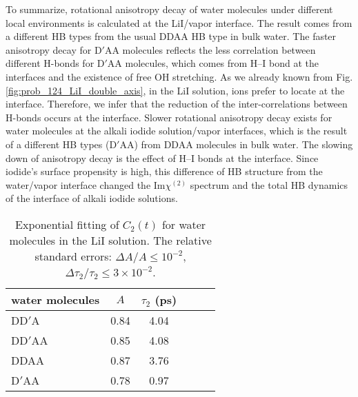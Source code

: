 To summarize, rotational anisotropy decay of water molecules under different local environments is calculated at the LiI/vapor interface. 
The result comes from a different HB types from the usual DDAA HB type in bulk water.
The faster anisotropy decay for D$'$AA molecules reflects the less correlation between different H-bonds for D$'$AA molecules, 
which comes from H--I bond at the interfaces and the existence of free OH stretching.
As we already known from Fig.\thinspace\ref{fig:prob_124_LiI_double_axis}, in the LiI solution, 
\I ions prefer to locate at the interface.  
Therefore, we infer that the reduction of the inter-correlations between H-bonds occurs at the interface. 
Slower rotational anisotropy decay exists for water molecules  at the alkali iodide solution/vapor interfaces, 
which is the result of a different HB types (D$'$AA) from DDAA molecules in bulk water. 
The slowing down of anisotropy decay is the effect of H--I bonds at the interface. 
Since iodide's surface propensity is high, this difference of HB structure from the water/vapor interface changed 
the Im$\chi^{(2)}$ spectrum and the total HB dynamics of the interface of alkali iodide solutions.  
%
\begin{table}[H]
\centering
\caption{\label{tab:fitting_c2_for_each_type_of_water}%
	Exponential fitting of $C_2(t)$ for water molecules in the LiI solution. 
        The relative standard errors: $\Delta A/A \le 10^{-2}$, $\Delta \tau_{2}/\tau_{2} \le 3\times 10^{-2}$.}
\begin{tabular}{lccccc}
water molecules & $A$  & $\tau_{2}$ (ps) \\
\hline
DD$'$A & 0.84 & 4.04  \\
DD$'$AA & 0.85 & 4.08  \\
DDAA & 0.87 & 3.76 \\
D$'$AA & 0.78 & 0.97 \\
\end{tabular}
\end{table}
%

